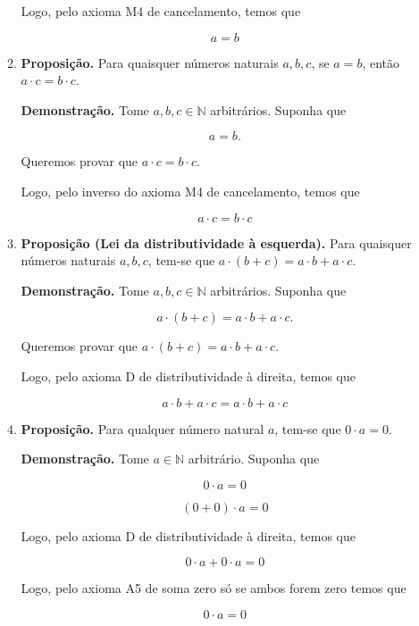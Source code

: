 \documentclass[12pt,a4paper]{article}
\begin{document}
\begin{enumerate}[label=(\alph*)]
\begin{enumerate}[label=(\alph*)]
        Logo, pelo axioma M4 de cancelamento, temos que

        \[
        a = b
        \]

        
        \item \textbf{Proposição.} Para quaisquer números naturais $a, b, c$, se $a = b$, então $a \cdot c = b \cdot c$.
        
        \textbf{Demonstração.} Tome $a, b, c \in \mathbb{N}$ arbitrários. Suponha que
        
        \[
        a = b.
        \]

        Queremos provar que $a \cdot c = b \cdot c$.

        Logo, pelo inverso do axioma M4 de cancelamento, temos que

        \[
        a \cdot c = b \cdot c
        \]


        \item \textbf{Proposição (Lei da distributividade à esquerda).} Para quaisquer números naturais $a, b, c$, tem-se que $a \cdot (b + c) = a \cdot b + a \cdot c$.
        
        \textbf{Demonstração.} Tome $a, b, c \in \mathbb{N}$ arbitrários. Suponha que
        
        \[
        a \cdot (b + c) = a \cdot b + a \cdot c.
        \]
        
        Queremos provar que $a \cdot (b + c) = a \cdot b + a \cdot c$.
        
        Logo, pelo axioma D de distributividade à direita, temos que
        
        \[
            a \cdot b + a \cdot c = a \cdot b + a \cdot c
        \]
        
        \item \textbf{Proposição.} Para qualquer número natural $a$, tem-se que $0 \cdot a = 0$.
        
        \textbf{Demonstração.} Tome $a \in \mathbb{N}$ arbitrário. Suponha que
        
        \[
            0 \cdot a = 0
        \]

        \[
            (0 + 0) \cdot a = 0
        \]

        Logo, pelo axioma D de distributividade à direita, temos que

        \[
            0 \cdot a + 0 \cdot a = 0
        \]

        Logo, pelo axioma A5 de soma zero só se ambos forem zero temos que

        \[
            0 \cdot a = 0
        \]



    \end{enumerate}


\end{enumerate}
\end{document}
